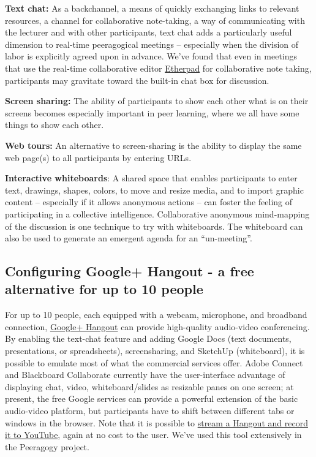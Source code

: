 \textbf{Text chat:} As a backchannel, a means of quickly exchanging
links to relevant resources, a channel for collaborative note-taking, a
way of communicating with the lecturer and with other participants, text
chat adds a particularly useful dimension to real-time peeragogical
meetings -- especially when the division of labor is explicitly agreed
upon in advance. We've found that even in meetings that use the
real-time collaborative editor \href{http://etherpad.org}{Etherpad} for
collaborative note taking, participants may gravitate toward the
built-in chat box for discussion.

\textbf{Screen sharing:} The ability of participants to show each other
what is on their screens becomes especially important in peer learning,
where we all have some things to show each other.

\textbf{Web tours:} An alternative to screen-sharing is the ability to
display the same web page(s) to all participants by entering URLs.

\textbf{Interactive whiteboards}: A shared space that enables
participants to enter text, drawings, shapes, colors, to move and resize
media, and to import graphic content -- especially if it allows
anonymous actions -- can foster the feeling of participating in a
collective intelligence. Collaborative anonymous mind-mapping of the
discussion is one technique to try with whiteboards. The whiteboard can
also be used to generate an emergent agenda for an ``un-meeting''.

\subsection{Configuring Google+ Hangout - a free alternative for up to
10 people}

For up to 10 people, each equipped with a webcam, microphone, and
broadband connection,
\href{http://lifehacker.com/5842191/google\%252B-hangouts-adds-screen-sharing-google-docs-collaboration-and-more}{Google+
Hangout} can provide high-quality audio-video conferencing. By enabling
the text-chat feature and adding Google Docs (text documents,
presentations, or spreadsheets), screensharing, and SketchUp
(whiteboard), it is possible to emulate most of what the commercial
services offer. Adobe Connect and Blackboard Collaborate currently have
the user-interface advantage of displaying chat, video,
whiteboard/slides as resizable panes on one screen; at present, the free
Google services can provide a powerful extension of the basic
audio-video platform, but participants have to shift between different
tabs or windows in the browser. Note that it is possible to
\href{http://www.google.com/+/learnmore/hangouts/onair.html}{stream a
Hangout and record it to YouTube}, again at no cost to the user. We've
used this tool extensively in the Peeragogy project.

